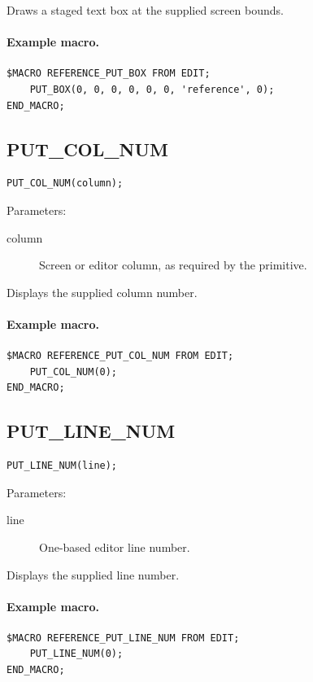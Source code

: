 \documentclass[a4paper,10pt,twoside,openany]{book}
\begin{document}
Draws a staged text box at the supplied screen bounds.

\paragraph{Example macro.}
\begin{verbatim}
$MACRO REFERENCE_PUT_BOX FROM EDIT;
    PUT_BOX(0, 0, 0, 0, 0, 0, 'reference', 0);
END_MACRO;
\end{verbatim}

\label{prim:procedure-put-col-num}
\subsection*{PUT\_COL\_NUM}
\begin{verbatim}
PUT_COL_NUM(column);
\end{verbatim}
Parameters:
\begin{description}
\item[column] Screen or editor column, as required by the primitive.
\end{description}

Displays the supplied column number.

\paragraph{Example macro.}
\begin{verbatim}
$MACRO REFERENCE_PUT_COL_NUM FROM EDIT;
    PUT_COL_NUM(0);
END_MACRO;
\end{verbatim}

\label{prim:procedure-put-line-num}
\subsection*{PUT\_LINE\_NUM}
\begin{verbatim}
PUT_LINE_NUM(line);
\end{verbatim}
Parameters:
\begin{description}
\item[line] One-based editor line number.
\end{description}

Displays the supplied line number.

\paragraph{Example macro.}
\begin{verbatim}
$MACRO REFERENCE_PUT_LINE_NUM FROM EDIT;
    PUT_LINE_NUM(0);
END_MACRO;
\end{verbatim}
\end{document}
